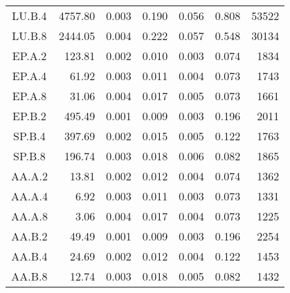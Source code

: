 \begin{ThreePartTable}
\begin{longtable}[c]{c*{6}{r}}
        LU.B.4                 & 4757.80                             & 0.003                               & 0.190          & 0.056 & 0.808 & 53522  \\
        LU.B.8                 & 2444.05                             & 0.004                               & 0.222          & 0.057 & 0.548 & 30134  \\
        EP.A.2                 & 123.81                              & 0.002                               & 0.010          & 0.003 & 0.074 & 1834   \\
        EP.A.4                 & 61.92                               & 0.003                               & 0.011          & 0.004 & 0.073 & 1743   \\
        EP.A.8                 & 31.06                               & 0.004                               & 0.017          & 0.005 & 0.073 & 1661   \\
        EP.B.2                 & 495.49                              & 0.001                               & 0.009          & 0.003 & 0.196 & 2011   \\
        SP.B.4                 & 397.69                              & 0.002                               & 0.015          & 0.005 & 0.122 & 1763   \\
        SP.B.8                 & 196.74                              & 0.003                               & 0.018          & 0.006 & 0.082 & 1865   \\
        AA.A.2                 & 13.81                               & 0.002                               & 0.012          & 0.004 & 0.074 & 1362   \\
        AA.A.4                 & 6.92                                & 0.003                               & 0.011          & 0.003 & 0.073 & 1331   \\
        AA.A.8                 & 3.06                                & 0.004                               & 0.017          & 0.004 & 0.073 & 1225   \\
        AA.B.2                 & 49.49                               & 0.001                               & 0.009          & 0.003 & 0.196 & 2254   \\
        AA.B.4                 & 24.69                               & 0.002                               & 0.012          & 0.004 & 0.122 & 1453   \\
        AA.B.8                 & 12.74                               & 0.003                               & 0.018          & 0.005 & 0.082 & 1432   \\

\end{longtable}
\end{ThreePartTable}
